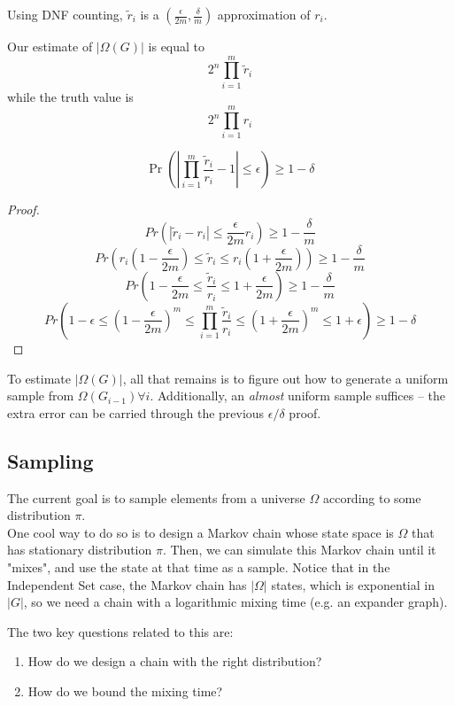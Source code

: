 Using DNF counting, $\tilde r_i$ is a $(\frac{\epsilon}{2m}, \frac{\delta}{m})$ approximation of $r_i$.

Our estimate of $|\Omega(G)|$ is equal to
\[ 2^n \prod_{i=1}^m \tilde r_i \]
while the truth value is
\[ 2^n \prod_{i=1}^m r_i \]

\begin{claim}
\[ \Pr\left(|\prod_{i=1}^m \frac{\tilde r_i}{r_i} - 1| \leq \epsilon\right) \geq 1 - \delta \]
\end{claim}

\begin{proof}
\[Pr\left( |\tilde r_i - r_i | \leq \frac{\epsilon}{2m}r_i\right) \geq 1 - \frac{\delta}{m}\]
\[Pr\left( r_i(1-\frac{\epsilon}{2m}) \leq \tilde r_i \leq r_i(1+\frac{\epsilon}{2m})\right) \geq 1 - \frac{\delta}{m} \]
\[Pr\left(1 - \frac{\epsilon}{2m} \leq \frac{\tilde r_i}{r_i} \leq 1 + \frac{\epsilon}{2m}\right) \geq 1 - \frac{\delta}{m} \]
\[Pr\left(1 - \epsilon \leq (1 - \frac{\epsilon}{2m})^m \leq \prod_{i=1}^m \frac{\tilde r_i}{r_i} \leq (1 + \frac{\epsilon}{2m})^m \leq 1 + \epsilon\right) \geq 1 - \delta \]
\end{proof}

To estimate $|\Omega(G)|$, all that remains is to figure out how to generate a uniform sample from $\Omega(G_{i-1}) \forall i$.
Additionally, an \emph{almost} uniform sample suffices -- the extra error can be carried through the previous $\epsilon/\delta$ proof.

\subsection{Sampling}
The current goal is to sample elements from a universe $\Omega$ according to some distribution $\pi$. \\
  One cool way to do so is to design a Markov chain whose state space is $\Omega$ that has stationary distribution $\pi$. Then, we can simulate this Markov chain until it "mixes", and use the state at that time as a sample. Notice that in the Independent Set case, the Markov chain has $|\Omega|$ states, which is exponential in $|G|$, so we need a chain with a logarithmic mixing time (e.g. an expander graph).

The two key questions related to this are:
\begin{enumerate}
\item How do we design a chain with the right distribution?
\item How do we bound the mixing time?
\end{enumerate}

